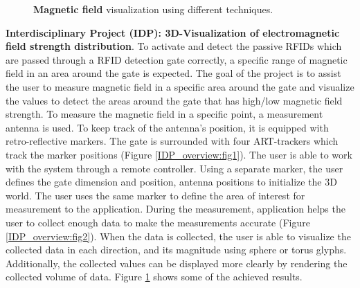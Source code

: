 \documentclass[]{report}
\begin{document}
\begin{figure}[!ht]
	\hfill
	\hfill
	\hfill
	\caption[Factory ray-tracing]{\textbf{Magnetic field} visualization using different techniques.}
	\label{fig:IDP_results}
\end{figure}
 
 \textbf{Interdisciplinary Project (IDP): 3D-Visualization of electromagnetic field strength distribution}. To activate and detect the passive RFIDs which are passed through a RFID detection gate correctly, a specific range of magnetic field in an area around the gate is expected. The goal of the project is to assist the user to measure magnetic field in a specific area around the gate and visualize the values to detect the areas around the gate that has high/low magnetic field strength. To measure the magnetic field in a specific point, a measurement antenna is used. To keep track of the antenna's position, it is equipped with retro-reflective markers. The gate is surrounded with four ART-trackers which track the marker positions (Figure \ref{IDP_overview:fig1}). The user is able to work with the system through a remote controller. Using a separate marker, the user defines the gate dimension and position, antenna positions to initialize the 3D world. The user uses the same marker to define the area of interest for measurement to the application. During the measurement, application helps the user to collect enough data to make the measurements accurate (Figure \ref{IDP_overview:fig2}). When the data is collected, the user is able to visualize the collected data in each direction, and its magnitude using sphere or torus glyphs. Additionally, the collected values can be displayed more clearly by rendering the collected volume of data. Figure \ref{fig:IDP_results} shows some of the achieved results.
\end{document}
